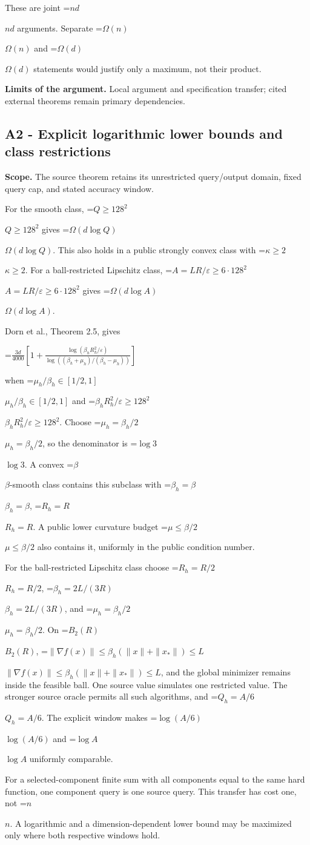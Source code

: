 \documentclass[10pt,a4paper]{article}
\newcommand{\AtlasMath}[1]{\par\begingroup\centering\setbox0=\hbox{$\displaystyle #1$}\ifdim\wd0>1.4\linewidth\typeout{ATLAS WIDE FORMULA: \the\wd0}\fi\ifdim\wd0>\linewidth\resizebox{\linewidth}{!}{\box0}\else\box0\fi\par\endgroup}
\newcommand{\AtlasInlineMath}[1]{\begingroup\setbox0=\hbox{$#1$}\ifdim\wd0>.4\linewidth\endgroup\AtlasMath{#1}\else\endgroup$#1$\fi}
\begin{document}
These are joint \AtlasInlineMath{nd} arguments. Separate \AtlasInlineMath{\Omega(n)} and \AtlasInlineMath{\Omega(d)} statements would justify only a maximum, not their product.

\textbf{Limits of the argument.} Local argument and specification transfer; cited external theorems remain primary dependencies.

\subsection{A2 - Explicit logarithmic lower bounds and class restrictions}
\textbf{Scope.} The source theorem retains its unrestricted query/output domain, fixed query cap, and stated accuracy window.

For the smooth class, \AtlasInlineMath{Q\ge128^2} gives \AtlasInlineMath{\Omega(d\log Q)}. This also holds in a public strongly convex class with \AtlasInlineMath{\kappa\ge2}. For a ball-restricted Lipschitz class, \AtlasInlineMath{A=LR/\varepsilon\ge6\cdot128^2} gives \AtlasInlineMath{\Omega(d\log A)}.

Dorn et al., Theorem 2.5, gives

\AtlasMath{\frac{3d}{4000}\left[1+\frac{\log(\beta_hR_h^2/\varepsilon)}{\log((\beta_h+\mu_h)/(\beta_h-\mu_h))}\right]}

when \AtlasInlineMath{\mu_h/\beta_h\in[1/2,1]} and \AtlasInlineMath{\beta_hR_h^2/\varepsilon\ge128^2}. Choose \AtlasInlineMath{\mu_h=\beta_h/2}, so the denominator is \AtlasInlineMath{\log3}. A convex \AtlasInlineMath{\beta}-smooth class contains this subclass with \AtlasInlineMath{\beta_h=\beta}, \AtlasInlineMath{R_h=R}. A public lower curvature budget \AtlasInlineMath{\mu\le\beta/2} also contains it, uniformly in the public condition number.

For the ball-restricted Lipschitz class choose \AtlasInlineMath{R_h=R/2}, \AtlasInlineMath{\beta_h=2L/(3R)}, and \AtlasInlineMath{\mu_h=\beta_h/2}. On \AtlasInlineMath{B_2(R)}, \AtlasInlineMath{\|\nabla f(x)\|\le\beta_h(\|x\|+\|x_*\|)\le L}, and the global minimizer remains inside the feasible ball. One source value simulates one restricted value. The stronger source oracle permits all such algorithms, and \AtlasInlineMath{Q_h=A/6}. The explicit window makes \AtlasInlineMath{\log(A/6)} and \AtlasInlineMath{\log A} uniformly comparable.

For a selected-component finite sum with all components equal to the same hard function, one component query is one source query. This transfer has cost one, not \AtlasInlineMath{n}. A logarithmic and a dimension-dependent lower bound may be maximized only where both respective windows hold.
\end{document}
